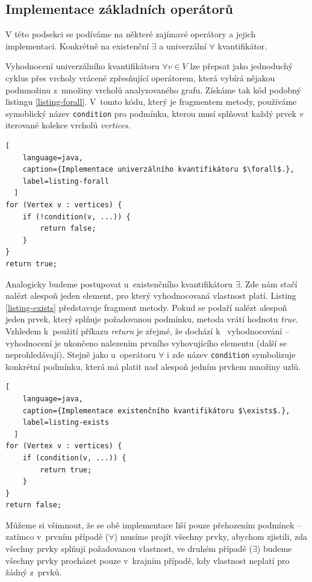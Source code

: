 \subsection{Implementace základních operátorů}
V této podsekci se podíváme na některé zajímavé operátory a jejich implementaci. Konkrétně na existenční $\exists$ a univerzální $\forall$ kvantifikátor.

Vyhodnocení univerzálního kvantifikátoru $\forall v \in V$ lze přepsat jako jednoduchý cyklus přes vrcholy vrácené zpřesňující operátorem, která vybírá nějakou podmnožinu z~množiny vrcholů analyzovaného grafu. Získáme tak kód podobný listingu \ref{listing-forall}. V~tomto kódu, který je fragmentem metody, používáme symoblický název \verb+condition+ pro podmínku, kterou musí splňovat každý prvek \emph{v} iterované kolekce vrcholů \emph{vertices}.
\vspace{0.5cm}
\begin{lstlisting}[
    language=java,
    caption={Implementace univerzálního kvantifikátoru $\forall$.},
    label=listing-forall
  ]
for (Vertex v : vertices) {
    if (!condition(v, ...)) {
        return false;
    }
}
return true;
\end{lstlisting}

Analogicky budeme postupovat u~existenčního kvantifikátoru $\exists$. Zde nám stačí nalézt alespoň jeden element, pro který vyhodnocovaná vlastnost platí. Listing \ref{listing-exists} představuje fragment metody. Pokud se podaří nalézt alespoň jeden prvek, který splňuje požadovanou podmínku, metoda vrátí hodnotu \emph{true}. Vzhledem k~použití příkazu \emph{return} je zřejmé, že dochází k~ vyhodnocování -- vyhodnocení je ukončeno nalezením prvního vyhovujícího elementu (další se neprohledávají). Stejně jako u~operátoru $\forall$ i zde název \verb+condition+ symbolizuje konkrétní podmínku, která má platit nad alespoň jedním prvkem množiny uzlů.

\vspace{0.5cm}
\begin{lstlisting}[
    language=java,
    caption={Implementace existenčního kvantifikátoru $\exists$.},
    label=listing-exists
  ]
for (Vertex v : vertices) {
    if (condition(v, ...)) {
        return true;
    }
}
return false;
\end{lstlisting}

Můžeme si všimnout, že se obě implementace liší pouze přehozením podmínek -- zatímco v~prvním případě ($\forall$) musíme projít všechny prvky, abychom zjistili, zda všechny prvky splňují požadovanou vlastnost, ve druhém případě ($\exists$) budeme všechny prvky procházet pouze v~krajním případě, kdy vlastnost neplatí pro žádný z~prvků.

